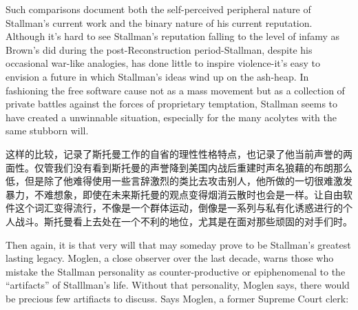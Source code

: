 \ifdefined\eng
Such comparisons document both the self-perceived peripheral nature of Stallman's current work and the binary nature of his current reputation. Although it's hard to see Stallman's reputation falling to the level of infamy as Brown's did during the post-Reconstruction period-Stallman, despite his occasional war-like analogies, has done little to inspire violence-it's easy to envision a future in which Stallman's ideas wind up on the ash-heap. In fashioning the free software cause not as a mass movement but as a collection of private battles against the forces of proprietary temptation, Stallman seems to have created a unwinnable situation, especially for the many acolytes with the same stubborn will.
\fi

\ifdefined\chs
这样的比较，记录了斯托曼工作的自省的理性性格特点，也记录了他当前声誉的两面性。仅管我们没有看到斯托曼的声誉降到美国内战后重建时声名狼藉的布朗那么低，但是除了他难得使用一些言辞激烈的类比去攻击别人，他所做的一切很难激发暴力，不难想象，即使在未来斯托曼的观点变得烟消云散时也会是一样。让自由软件这个词汇变得流行，不像是一个群体运动，倒像是一系列与私有化诱惑进行的个人战斗。斯托曼看上去处在一个不利的地位，尤其是在面对那些顽固的对手们时。%
\fi

\ifdefined\eng
Then again, it is that very will that may someday prove to be Stallman's greatest lasting legacy. Moglen, a close observer over the last decade, warns those who mistake the Stallman personality as counter-productive or epiphenomenal to the ``artifacts'' of Stalllman's life. Without that personality, Moglen says, there would be precious few artifiacts to discuss. Says Moglen, a former Supreme Court clerk:
\fi

